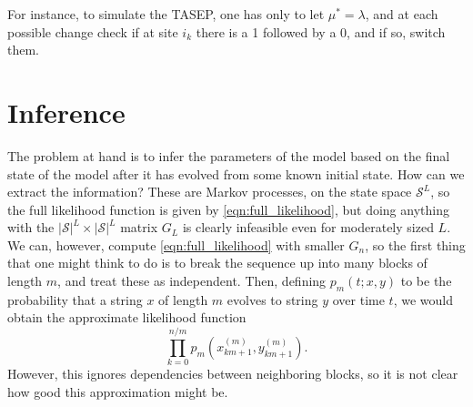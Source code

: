 \documentclass{article}
\newcommand{\calS}{\mathcal{S}}  %
\theoremstyle{plain}
\theoremstyle{definition}
\begin{document}
For instance, to simulate the TASEP, one has only to let $\mu^*=\lambda$,
and at each possible change
check if at site $i_k$ there is a 1 followed by a 0,
and if so, switch them.


\section{Inference}


The problem at hand is to infer the parameters of the model based on the final state of the model after it has evolved from some known initial state.
How can we extract the information?
These are Markov processes, on the state space $\calS^L$,
so the full likelihood function is given by \eqref{eqn:full_likelihood},
but doing anything with the $|\calS|^L \times |\calS|^L$ matrix $G_L$ is clearly infeasible even for moderately sized $L$.
We can, however, compute \eqref{eqn:full_likelihood} with smaller $G_n$,
so the first thing that one might think to do is to break the sequence up into many blocks of length $m$,
and treat these as independent.
Then, defining $p_m(t;x,y)$ to be the probability that a string $x$ of length $m$ evolves to string $y$ over time $t$,
we would obtain the approximate likelihood function
\[
  \prod_{k=0}^{n/m} p_m(x_{km+1}^{(m)},y_{km+1}^{(m)}) .
\]
However, this ignores dependencies between neighboring blocks,
so it is not clear how good this approximation might be.
\end{document}
